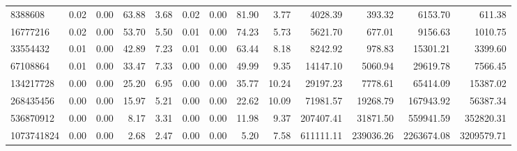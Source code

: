 \begin{tabular}{lrrrrrrrrrrrr}
8388608 & 0.02 & 0.00 & 63.88 & 3.68 & 0.02 & 0.00 & 81.90 & 3.77 & 4028.39 & 393.32 & 6153.70 & 611.38 \\
16777216 & 0.02 & 0.00 & 53.70 & 5.50 & 0.01 & 0.00 & 74.23 & 5.73 & 5621.70 & 677.01 & 9156.63 & 1010.75 \\
33554432 & 0.01 & 0.00 & 42.89 & 7.23 & 0.01 & 0.00 & 63.44 & 8.18 & 8242.92 & 978.83 & 15301.21 & 3399.60 \\
67108864 & 0.01 & 0.00 & 33.47 & 7.33 & 0.00 & 0.00 & 49.99 & 9.35 & 14147.10 & 5060.94 & 29619.78 & 7566.45 \\
134217728 & 0.00 & 0.00 & 25.20 & 6.95 & 0.00 & 0.00 & 35.77 & 10.24 & 29197.23 & 7778.61 & 65414.09 & 15387.02 \\
268435456 & 0.00 & 0.00 & 15.97 & 5.21 & 0.00 & 0.00 & 22.62 & 10.09 & 71981.57 & 19268.79 & 167943.92 & 56387.34 \\
536870912 & 0.00 & 0.00 & 8.17 & 3.31 & 0.00 & 0.00 & 11.98 & 9.37 & 207407.41 & 31871.50 & 559941.59 & 352820.31 \\
1073741824 & 0.00 & 0.00 & 2.68 & 2.47 & 0.00 & 0.00 & 5.20 & 7.58 & 611111.11 & 239036.26 & 2263674.08 & 3209579.71 \\
\bottomrule
\end{tabular}
